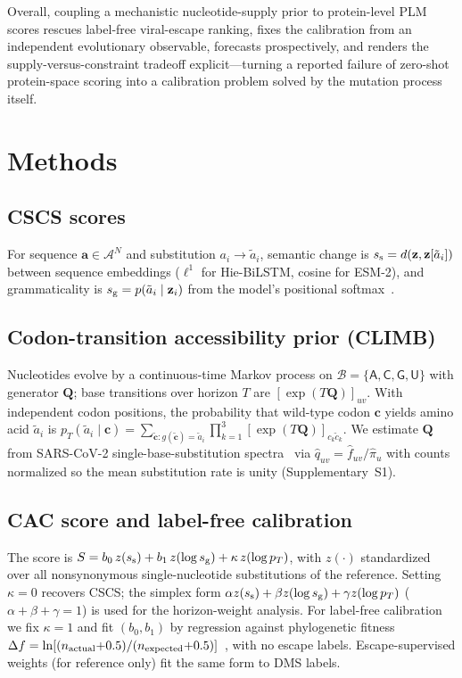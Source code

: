 \documentclass[11pt]{article}
\begin{document}
Overall, coupling a mechanistic nucleotide-supply prior to protein-level PLM scores rescues label-free viral-escape ranking, fixes the calibration from an independent evolutionary observable, forecasts prospectively, and renders the supply-versus-constraint tradeoff explicit---turning a reported failure of zero-shot protein-space scoring into a calibration problem solved by the mutation process itself.

\section*{Methods}

\subsection*{CSCS scores}
For sequence $\mathbf{a}\in\mathcal{A}^N$ and substitution $a_i\to\tilde a_i$, semantic change is $s_{\rm s}=d(\mathbf{z},\mathbf{z}[\tilde a_i])$ between sequence embeddings ($\ell^1$ for Hie-BiLSTM, cosine for ESM-2), and grammaticality is $s_{\rm g}=p(\tilde a_i\mid \mathbf{z}_i)$ from the model's positional softmax~\cite{hie2021learning}.

\subsection*{Codon-transition accessibility prior (CLIMB)}
Nucleotides evolve by a continuous-time Markov process on $\mathcal{B}=\{\mathsf A,\mathsf C,\mathsf G,\mathsf U\}$ with generator $\bm Q$; base transitions over horizon $T$ are $[\exp(T\bm Q)]_{uv}$. With independent codon positions, the probability that wild-type codon $\mathbf c$ yields amino acid $\tilde a_i$ is $p_T(\tilde a_i\mid\mathbf c)=\sum_{\tilde{\mathbf c}:g(\tilde{\mathbf c})=\tilde a_i}\prod_{k=1}^3[\exp(T\bm Q)]_{c_k\tilde c_k}$. We estimate $\bm Q$ from SARS-CoV-2 single-base-substitution spectra~\cite{Yi2021Mutational} via $\hat q_{uv}=\hat f_{uv}/\hat\pi_u$ with counts normalized so the mean substitution rate is unity (Supplementary~S1).

\subsection*{CAC score and label-free calibration}
The score is $S=b_0\,z(s_{\rm s})+b_1\,z(\log s_{\rm g})+\kappa\,z(\log p_T)$, with $z(\cdot)$ standardized over all nonsynonymous single-nucleotide substitutions of the reference. Setting $\kappa=0$ recovers CSCS; the simplex form $\alpha z(s_{\rm s})+\beta z(\log s_{\rm g})+\gamma z(\log p_T)$ ($\alpha+\beta+\gamma=1$) is used for the horizon-weight analysis. For label-free calibration we fix $\kappa=1$ and fit $(b_0,b_1)$ by regression against phylogenetic fitness $\Delta f=\ln[(n_{\rm actual}{+}0.5)/(n_{\rm expected}{+}0.5)]$~\cite{bloom2023fitness}, with no escape labels. Escape-supervised weights (for reference only) fit the same form to DMS labels.
\end{document}
